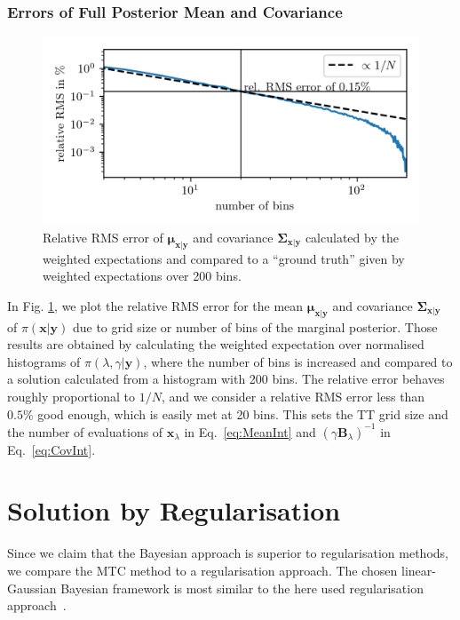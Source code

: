 \subsubsection{Errors of Full Posterior Mean and Covariance}
\begin{figure}[ht!]
	\centering
	\includegraphics{relErrO3MeanVar.png}
	\caption[Relative Error of full posterior mean and covariance.]{Relative RMS error of $\bm{\mu}_{\bm{x}|\bm{y}}$ and covariance $\bm{\Sigma}_{\bm{x}|\bm{y}}$ calculated by the weighted expectations and compared to a ``ground truth'' given by weighted expectations over 200 bins.}
	\label{fig:MeanVarError}
\end{figure}
In Fig. \ref{fig:MeanVarError}, we plot the relative RMS error for the mean $\bm{\mu}_{\bm{x}|\bm{y}}$ and covariance $\bm{\Sigma}_{\bm{x}|\bm{y}}$ of $\pi(\bm{x}|\bm{y})$ due to grid size or number of bins of the marginal posterior.
Those results are obtained by calculating the weighted expectation over normalised histograms of $\pi(\lambda,\gamma | \bm{y})$, where the number of bins is increased and compared to a solution calculated from a histogram with 200 bins.
The relative error behaves roughly proportional to $1/N$, and we consider a relative RMS error less than $0.5\%$ good enough, which is easily met at 20 bins.
This sets the TT grid size and the number of evaluations of $\bm{x}_{\lambda}$ in Eq.~\ref{eq:MeanInt} and $(\gamma \bm{B}_{\lambda})^{-1}$ in Eq.~\ref{eq:CovInt}.



\section{Solution by Regularisation}
\label{sec:SolByReg}
Since we claim that the Bayesian approach is superior to regularisation methods, we compare the MTC method to a regularisation approach.
The chosen linear-Gaussian Bayesian framework is most similar to the here used regularisation approach~\cite{fox2016fast}.

